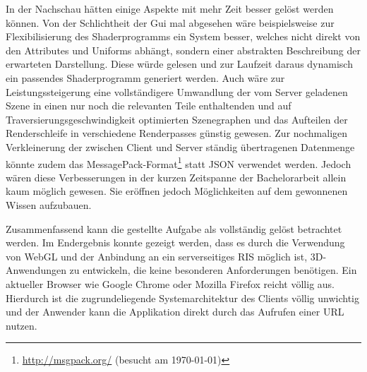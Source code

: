 In der Nachschau hätten einige Aspekte mit mehr Zeit besser gelöst werden können. Von der Schlichtheit der Gui mal abgesehen wäre beispielsweise zur Flexibilisierung des Shaderprogramms ein System besser, welches nicht direkt von den Attributes und Uniforms abhängt, sondern einer abstrakten Beschreibung der erwarteten Darstellung. Diese würde gelesen und zur Laufzeit daraus dynamisch ein passendes Shaderprogramm generiert werden. Auch wäre zur Leistungssteigerung eine vollständigere Umwandlung der vom Server geladenen Szene in einen nur noch die relevanten Teile enthaltenden und auf Traversierungsgeschwindigkeit optimierten Szenegraphen und das Aufteilen der Renderschleife in verschiedene Renderpasses günstig gewesen. Zur nochmaligen Verkleinerung der zwischen Client und Server ständig übertragenen Datenmenge könnte zudem das MessagePack-Format\footnote{\url{http://msgpack.org/} (besucht am \today)} statt JSON verwendet werden. Jedoch wären diese Verbesserungen in der kurzen Zeitspanne der Bachelorarbeit allein kaum möglich gewesen. Sie eröffnen jedoch Möglichkeiten auf dem gewonnenen Wissen aufzubauen.

Zusammenfassend kann die gestellte Aufgabe als vollständig gelöst betrachtet werden. Im Endergebnis konnte gezeigt werden, dass es durch die Verwendung von WebGL und der Anbindung an ein serverseitiges RIS möglich ist, 3D-Anwendungen zu entwickeln, die keine besonderen Anforderungen benötigen. Ein aktueller Browser wie Google Chrome oder Mozilla Firefox reicht völlig aus. Hierdurch ist die zugrundeliegende Systemarchitektur des Clients völlig unwichtig und der Anwender kann die Applikation direkt durch das Aufrufen einer URL nutzen.

